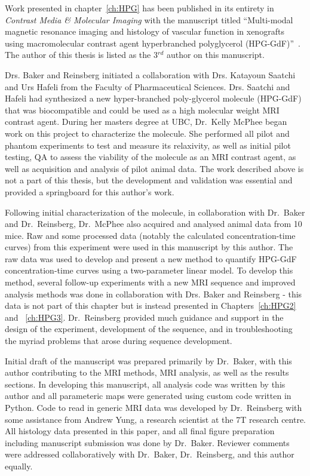 Work presented in chapter~\ref{ch:HPG} has been published in its entirety in \emph{Contrast Media \& Molecular Imaging} with the manuscript titled ``Multi-modal magnetic resonance imaging and histology of vascular function in xenografts using macromolecular contrast agent hyperbranched polyglycerol (\acs{HPG-GdF})''~\cite{Baker:2015cob}.
The author of this thesis is listed as the 3$^{rd}$ author on this manuscript.

Drs. Baker and Reinsberg initiated a collaboration with Drs. Katayoun Saatchi and Urs Hafeli from the Faculty of Pharmaceutical Sciences.
Drs. Saatchi and Hafeli had synthesized a new hyper-branched poly-glycerol molecule (\acs{HPG-GdF}) that was biocompatible and could be used as a high molecular weight MRI contrast agent.
During her masters degree at UBC, Dr.\ Kelly McPhee began work on this project to characterize the molecule. 
She performed all pilot and phantom experiments to test and measure its relaxivity, as well as initial pilot testing, QA to assess the viability of the molecule as an MRI contrast agent, as well as acquisition and analysis of pilot animal data.
The work described above is not a part of this thesis, but the development and validation was essential and provided a springboard for this author's work.

Following initial characterization of the molecule, in collaboration with Dr.\ Baker and Dr.\ Reinsberg, Dr.\ McPhee also acquired and analysed animal data from 10 mice. 
Raw and some processed data (notably the calculated concentration-time curves) from this experiment were used in this manuscript by this author.
The raw data was used to develop and present a new method to quantify \acs{HPG-GdF} concentration-time curves using a two-parameter linear model.
To develop this method, several follow-up experiments with a new MRI sequence and improved analysis methods was done in collaboration with Drs. Baker and Reinsberg - this data is not part of this chapter but is instead presented in Chapters~\ref{ch:HPG2} and ~\ref{ch:HPG3}.
Dr.\ Reinsberg provided much guidance and support in the design of the experiment, development of the sequence, and in troubleshooting the myriad problems that arose during sequence development.

Initial draft of the manuscript was prepared primarily by Dr.\ Baker, with this author contributing to the MRI methods, MRI analysis, as well as the results sections. 
In developing this manuscript, all analysis code was written by this author and all parameteric maps were generated using custom code written in Python.
Code to read in generic MRI data was developed by Dr.\ Reinsberg with some assistance from Andrew Yung, a research scientist at the 7T research centre.
All histology data presented in this paper, and all final figure preparation  including manuscript submission was done by Dr.\ Baker.
Reviewer comments were addressed collaboratively with Dr.\ Baker, Dr.\ Reinsberg, and this author equally.


